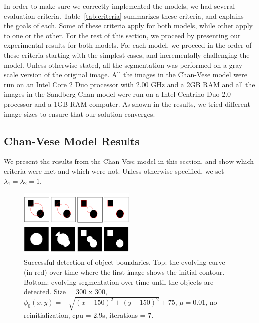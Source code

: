 \documentclass[10pt,twocolumn,letterpaper]{article}
\begin{document}
In order to make sure we correctly implemented the models, we had several evaluation criteria. Table~\ref{tab:criteria} summarizes these criteria, and explains
the goals of each. Some of these criteria apply for both models, while other apply to one or the other. For the rest of this section, we proceed by presenting
our experimental results for both models. For each model, we proceed in the order of these criteria starting with the simplest
cases, and incrementally challenging the model. Unless otherwise stated, all the segmentation was performed on a gray scale version of the original image. All
the images in the Chan-Vese model were run on an Intel Core 2 Duo processor with 2.00 GHz and a 2GB RAM and all the images in the Sandberg-Chan
model were run on a Intel Centrino Duo 2.0 processor and a 1GB RAM computer. As shown in the results,
we tried different image sizes to ensure that our solution converges.



\subsection{Chan-Vese Model Results}

We present the results from the Chan-Vese model in this section, and show which criteria were met and which were not. Unless otherwise specified, we set
$\lambda_{1} = \lambda_{2} = 1$.

\begin{figure}[t]
\centering
\includegraphics[width=0.5\textwidth]{cv_eg1.png}
\caption{Successful detection of object boundaries. Top: the evolving curve (in red) over time where the first image shows the initial contour.
Bottom: evolving segmentation over time until the objects are detected. Size = 300 x 300, $\phi_{0}(x,y) = - \sqrt{(x - 150)^2 + (y - 150)^2} + 75$, $\mu =
0.01$, no reinitialization, cpu = 2.9s, iterations = 7.}
\label{fig:cv_eg1}
\end{figure}
\end{document}
